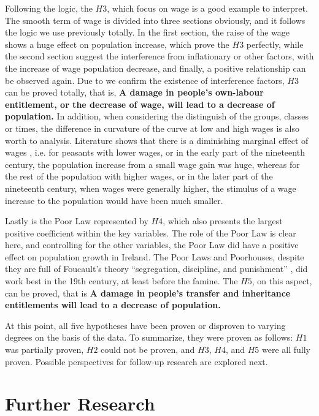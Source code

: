 Following the logic, the $H3$, which focus on wage is a good example to interpret. The smooth term of wage is divided into three sections obviously, and it follows the logic we use previously totally. In the first section, the raise of the wage shows a huge effect on population increase, which prove the $H3$ perfectly, while the second section suggest  the interference from inflationary or other factors, with the increase of wage population decrease, and finally, a positive relationship can be observed again. Due to we confirm the existence of interference factors, $H3$ can be proved totally, that is, \textbf{A damage in people's own-labour entitlement, or the decrease of wage, will lead to a decrease of population.} In addition, when considering the distinguish of the groups, classes or times, the difference in curvature of the curve at low and high wages is also worth to analysis. Literature shows that there is a diminishing marginal effect of wages \citep{li2012capital}, i.e. for peasants with lower wages, or in the early part of the nineteenth century, the population increase from a small wage gain was huge, whereas for the rest of the population with higher wages, or in the later part of the nineteenth century, when wages were generally higher, the stimulus of a wage increase to the population would have been much smaller.

Lastly is the Poor Law represented by $H4$, which also presents the largest positive coefficient within the key variables. The role of the Poor Law is clear here, and controlling for the other variables, the Poor Law did have a positive effect on population growth in Ireland. The Poor Laws and Poorhouses, despite they are full of Foucault's theory ``segregation, discipline, and punishment'' \citep{foucault2023discipline}, did work best in the 19th century, at least before the famine. The $H5$, on this aspect, can be proved, that is \textbf{A damage in people's transfer and inheritance entitlements will lead to a decrease of population.}

At this point, all five hypotheses have been proven or disproven to varying degrees on the basis of the data. To summarize, they were proven as follows: $H1$ was partially proven, $H2$ could not be proven, and $H3$, $H4$, and $H5$ were all fully proven. Possible perspectives for follow-up research are explored next.

\newpage

\section{Further Research}

